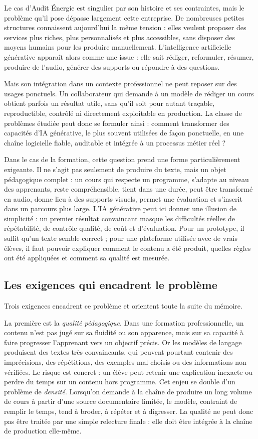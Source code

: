 \documentclass[12pt,a4paper]{article}
\begin{document}
Le cas d'Audit Énergie est singulier par son histoire et ses contraintes, mais le problème
qu'il pose dépasse largement cette entreprise. De nombreuses petites structures connaissent
aujourd'hui la même tension : elles veulent proposer des services plus riches, plus
personnalisés et plus accessibles, sans disposer des moyens humains pour les produire
manuellement. L'intelligence artificielle générative apparaît alors comme une issue : elle
sait rédiger, reformuler, résumer, produire de l'audio, générer des supports ou répondre à
des questions.

Mais son intégration dans un contexte professionnel ne peut reposer sur des usages
ponctuels. Un collaborateur qui demande à un modèle de rédiger un cours obtient parfois
un résultat utile, sans qu'il soit pour autant traçable, reproductible, contrôlé ni
directement exploitable en production. La classe de problèmes étudiée peut donc se
formuler ainsi : comment transformer des capacités d'IA générative, le plus souvent
utilisées de façon ponctuelle, en une chaîne logicielle fiable, auditable et intégrée à un
processus métier réel ?

Dans le cas de la formation, cette question prend une forme particulièrement exigeante. Il
ne s'agit pas seulement de produire du texte, mais un objet pédagogique complet : un cours
qui respecte un programme, s'adapte au niveau des apprenants, reste compréhensible,
tient dans une durée, peut être transformé en audio, donne lieu à des supports visuels,
permet une évaluation et s'inscrit dans un parcours plus large. L'IA générative peut ici
donner une illusion de simplicité : un premier résultat convaincant masque les difficultés
réelles de répétabilité, de contrôle qualité, de coût et d'évaluation. Pour un prototype, il
suffit qu'un texte semble correct ; pour une plateforme utilisée avec de vrais élèves, il faut
pouvoir expliquer comment le contenu a été produit, quelles règles ont été appliquées et
comment sa qualité est mesurée.

\subsection{Les exigences qui encadrent le problème}

Trois exigences encadrent ce problème et orientent toute la suite du mémoire.

La première est la \emph{qualité pédagogique}. Dans une formation professionnelle, un
contenu n'est pas jugé sur sa fluidité ou son apparence, mais sur sa capacité à faire
progresser l'apprenant vers un objectif précis. Or les modèles de langage produisent des
textes très convaincants, qui peuvent pourtant contenir des imprécisions, des répétitions,
des exemples mal choisis ou des informations non vérifiées. Le risque est concret : un
élève peut retenir une explication inexacte ou perdre du temps sur un contenu hors
programme. Cet enjeu se double d'un problème de \emph{densité}. Lorsqu'on demande à
la chaîne de produire un long volume de cours à partir d'une source documentaire limitée,
le modèle, contraint de remplir le temps, tend à broder, à répéter et à digresser. La qualité
ne peut donc pas être traitée par une simple relecture finale : elle doit être intégrée à la
chaîne de production elle-même.
\end{document}
